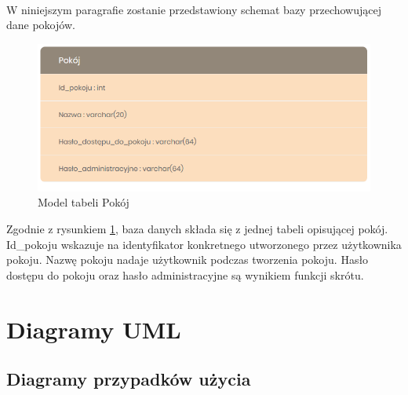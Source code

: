 \documentclass{article}
\begin{document}
	\paragraph{} W niniejszym paragrafie zostanie przedstawiony schemat bazy przechowującej dane pokojów.
	\begin{figure}[h]
		\centering
		\includegraphics[scale=0.7]{BD}
		\caption[]{Model tabeli Pokój}
		\label{fig:BD}
	\end{figure}

	Zgodnie z rysunkiem \ref{fig:BD}, baza danych składa się z jednej tabeli opisującej pokój. Id\_pokoju wskazuje na identyfikator konkretnego utworzonego przez użytkownika pokoju. Nazwę pokoju nadaje użytkownik podczas tworzenia pokoju. Hasło dostępu do pokoju oraz hasło administracyjne są wynikiem funkcji skrótu. 
	\section{Diagramy UML}
	\subsection{Diagramy przypadków użycia}
\end{document}
